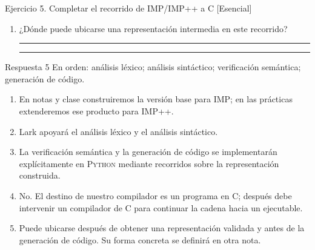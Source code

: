 \documentclass[11pt,spanish]{article}
\newcommand{\blank}[1][4cm]{\rule{#1}{0.4pt}}
\begin{document}
\begin{ejercicio}{Ejercicio 5. Completar el recorrido de \textsc{IMP}/\textsc{IMP++} a \textsc{C} \hfill {\small [Esencial]}}
\begin{enumerate}[leftmargin=*]
    \ifrespuestas\else
    \blank[14cm]

    \blank[14cm]
    \fi

    \item ¿Dónde puede ubicarse una representación intermedia en este recorrido?

    \ifrespuestas\else
    \blank[14cm]

    \blank[14cm]
    \fi
\end{enumerate}
\end{ejercicio}

\ifrespuestas
\begin{respuesta}{Respuesta 5}
En orden: análisis léxico; análisis sintáctico; verificación semántica; generación de código.

\begin{enumerate}[leftmargin=*]
    \item En notas y clase construiremos la versión base para \textsc{IMP}; en las prácticas extenderemos ese producto para \textsc{IMP++}.
    \item Lark apoyará el análisis léxico y el análisis sintáctico.
    \item La verificación semántica y la generación de código se implementarán explícitamente en \textsc{Python} mediante recorridos sobre la representación construida.
    \item No. El destino de nuestro compilador es un programa en \textsc{C}; después debe intervenir un compilador de \textsc{C} para continuar la cadena hacia un ejecutable.
    \item Puede ubicarse después de obtener una representación validada y antes de la generación de código. Su forma concreta se definirá en otra nota.
\end{enumerate}
\end{respuesta}
\fi
\end{document}
